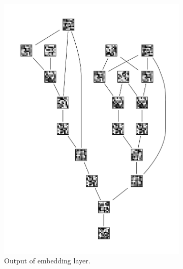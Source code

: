 \documentclass[runningheads]{llncs}
\begin{document}
\begin{figure}
	\centering
	\captionsetup[subfigure]{justification=centering}
	\begin{subfigure}{.3\textwidth}
		\centering
		\includegraphics[width=\linewidth]{embedding}
		\caption{Output of embedding layer.}
	\end{subfigure}
	\begin{subfigure}{.3\textwidth}
		\centering

\end{subfigure}
\end{figure}
\end{document}

